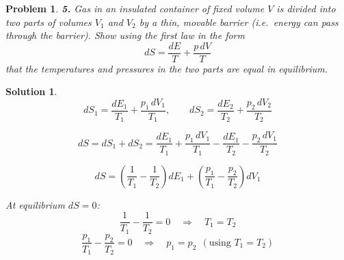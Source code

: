 \documentclass[11pt]{article}
\newtheorem*{problem}{Problem}
\newtheorem*{solution}{Solution}
\begin{document}
\begin{problem}
\textbf{5.} Gas in an insulated container of fixed volume $V$ is divided into two parts of volumes
$V_1$ and $V_2$ by a thin, movable barrier (i.e.\ energy can pass through the barrier). Show
using the first law in the form
\[
dS = \frac{dE}{T} + \frac{p\,dV}{T}
\]
that the temperatures and pressures in the two parts are equal in equilibrium.
\end{problem}

\begin{solution}
\[
dS_1 = \frac{dE_1}{T_1} + \frac{p_1\,dV_1}{T_1},
\qquad
dS_2 = \frac{dE_2}{T_2} + \frac{p_2\,dV_2}{T_2}
\]

\[
dS = dS_1 + dS_2
= \frac{dE_1}{T_1} + \frac{p_1\,dV_1}{T_1} - \frac{dE_1}{T_2} - \frac{p_2\,dV_1}{T_2}
\]

\[
dS = \left(\frac{1}{T_1} - \frac{1}{T_2}\right) dE_1
+ \left(\frac{p_1}{T_1} - \frac{p_2}{T_2}\right) dV_1
\]

At equilibrium $dS = 0$:
\[
\frac{1}{T_1} - \frac{1}{T_2} = 0
\quad \Longrightarrow \quad
\boxed{T_1 = T_2}
\]
\[
\frac{p_1}{T_1} - \frac{p_2}{T_2} = 0
\quad \Longrightarrow \quad
\boxed{p_1 = p_2} \ \ (\text{using } T_1 = T_2)
\]
\end{solution}
\end{document}
